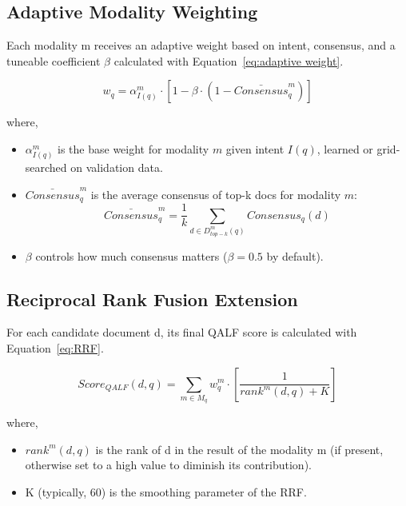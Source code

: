 \documentclass[11pt]{article}
\begin{document}
\subsection{Adaptive Modality Weighting}

Each modality m receives an adaptive weight based on intent, consensus, and a tuneable coefficient \(\beta\) calculated with Equation~\ref{eq:adaptive weight}.

\begin{equation}
    \label{eq:adaptive weight}
    w_q=\alpha_{I(q)}^m \cdot \left[ 1-\beta \cdot \left( 1-\bar{Consensus}_q^m \right) \right]
\end{equation}

where,
\begin{itemize}
    \item \(\alpha_{I(q)}^m\) is the base weight for modality \(m\) given intent \(I(q)\), learned or grid-searched on validation data.
    \item \(\bar{Consensus}_q^m\) is the average consensus of top-k docs for modality \(m\):
    \begin{equation}
        \bar{Consensus}_q^m=\frac{1}{k} \sum_{d\in D_{top-k}^m(q)} Consensus_q(d)
    \end{equation}
    \item \(\beta\) controls how much consensus matters (\(\beta=0.5\) by default).
\end{itemize}


\subsection{Reciprocal Rank Fusion Extension}

For each candidate document d, its final QALF score is calculated with Equation~\ref{eq:RRF}.

\begin{equation}
    \label{eq:RRF}
    Score_{QALF}(d,q)=\sum_{m\in M_q}w_q^m \cdot \left[ \frac{1}{rank^m (d,q)+K} \right]
\end{equation}

where,
\begin{itemize}
    \item \(rank^m(d,q)\) is the rank of d in the result of the modality m (if present, otherwise set to a high value to diminish its contribution).
    \item K (typically, 60) is the smoothing parameter of the RRF.
\end{itemize}
\end{document}
